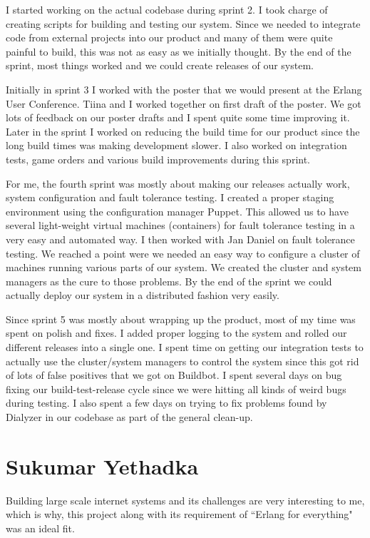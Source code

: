 \documentclass[11pt,a4paper]{report}
\begin{document}
I started working on the actual codebase during sprint 2. I took charge of
creating scripts for building and testing our system. Since we needed to
integrate code from external projects into our product and many of them were
quite painful to build, this was not as easy as we initially thought. By the end
of the sprint, most things worked and we could create releases of our system.

Initially in sprint 3 I worked with the poster that we would present at the
Erlang User Conference. Tiina and I worked together on first draft of the
poster. We got lots of feedback on our poster drafts and I spent quite some time
improving it. Later in the sprint I worked on reducing the build time for our
product since the long build times was making development slower. I also worked
on integration tests, game orders and various build improvements during this
sprint.

For me, the fourth sprint was mostly about making our releases actually work,
system configuration and fault tolerance testing. I created a proper staging
environment using the configuration manager Puppet. This allowed us to have
several light-weight virtual machines (containers) for fault tolerance testing
in a very easy and automated way. I then worked with Jan Daniel on fault
tolerance testing. We reached a point were we needed an easy way to configure a
cluster of machines running various parts of our system. We created the cluster
and system managers as the cure to those problems. By the end of the sprint we
could actually deploy our system in a distributed fashion very easily.

Since sprint 5 was mostly about wrapping up the product, most of my time was
spent on polish and fixes. I added proper logging to the system and rolled our
different releases into a single one. I spent time on getting our integration
tests to actually use the cluster/system managers to control the system since
this got rid of lots of false positives that we got on Buildbot. I spent several
days on bug fixing our build-test-release cycle since we were hitting all kinds
of weird bugs during testing. I also spent a few days on trying to fix problems
found by Dialyzer in our codebase as part of the general clean-up.
\section{Sukumar Yethadka}
Building large scale internet systems and its challenges are very interesting to me, which is why, this project along with its requirement of ``Erlang for everything" was an ideal fit.
\end{document}
